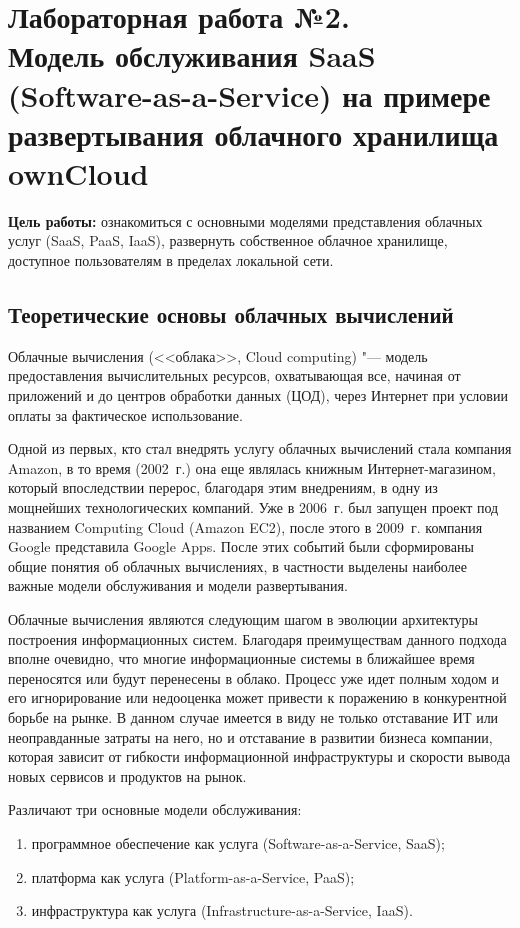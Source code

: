 \section[Лабораторная работа №2]{Лабораторная работа №2. \\
Модель обслуживания SaaS (Software-as-a-Service) на примере развертывания облачного хранилища ownCloud}

\textbf{Цель работы:} ознакомиться с основными моделями представления облачных услуг (SaaS, PaaS, IaaS), развернуть собственное облачное хранилище, доступное пользователям в пределах локальной сети.

\subsection{Теоретические основы облачных вычислений}

Облачные вычисления (<<облака>>, Cloud computing) "--- модель предоставления вычислительных ресурсов, охватывающая все, начиная от приложений и до центров обработки данных (ЦОД), через Интернет при условии оплаты за фактическое использование. \cite{cloud}

Одной из первых, кто стал внедрять услугу облачных вычислений стала компания Amazon, в то время (2002~г.) она еще являлась книжным Интернет-магазином, который впоследствии перерос, благодаря этим внедрениям, в одну из мощнейших технологических компаний.
Уже в 2006~г. был запущен проект под названием Computing Cloud (Amazon EC2), после этого в 2009~г. компания Google представила Google Apps.
После этих событий были сформированы общие понятия об облачных вычислениях, в частности выделены наиболее важные модели обслуживания и модели развертывания.

Облачные вычисления являются следующим шагом в эволюции архитектуры построения информационных систем.
Благодаря преимуществам данного подхода вполне очевидно, что многие информационные системы в ближайшее время переносятся или будут перенесены в облако.
Процесс уже идет полным ходом и его игнорирование или недооценка может привести к поражению в конкурентной борьбе на рынке.
В данном случае имеется в виду не только отставание ИТ или неоправданные затраты на него, но и отставание в развитии бизнеса компании, которая зависит от гибкости информационной инфраструктуры и скорости вывода новых сервисов и продуктов на рынок.

Различают три основные модели обслуживания:
\begin{enumerate}
    \item программное обеспечение как услуга (Software-as-a-Service, SaaS);
    \item платформа как услуга (Platform-as-a-Service, PaaS);
    \item инфраструктура как услуга (Infrastructure-as-a-Service, IaaS).
\end{enumerate}

